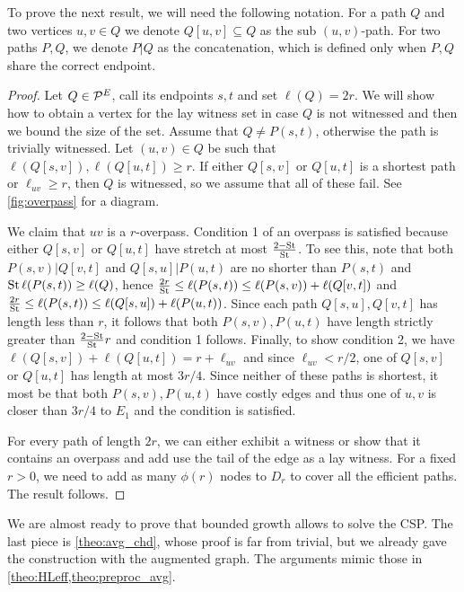 To prove the next result, we will need the following notation.
For a path $Q$ and two vertices $u,v\in Q$ we denote $Q[u,v]\subseteq Q$ as the sub $(u,v)$-path.
For two paths $P,Q$, we denote $P|Q$ as the concatenation, which is defined only when $P,Q$ share the correct endpoint.

\begin{proof}
Let $Q\in\mathcal{P}^E$, call its endpoints $s,t$ and set $\ell(Q)=2r$.
We will show how to obtain a vertex for the lay witness set in case $Q$ is not witnessed and then we bound the size of the set.
Assume that $Q\neq P(s,t)$, otherwise the path is trivially witnessed.
Let $(u,v)\in Q$ be such that $\ell(Q[s,v]),\ell(Q[u,t])\geq r$. 
If either $Q[s,v]$ or $Q[u,t]$ is a shortest path or $\ell_{uv}\geq r$, then $Q$ is witnessed, so we assume that all of these fail.
See \cref{fig:overpass} for a diagram.

We claim that $uv$ is a $r$-overpass.
Condition 1 of an overpass is satisfied because either $Q[s,v]$ or $Q[u,t]$ have stretch at most $\frac{2-\operatorname{St}}{\operatorname{St}}$.
To see this, note that both $P(s,v)|Q[v,t]$ and $Q[s,u]|P(u,t)$ are no shorter than $P(s,t)$ and $\operatorname{St}\ell(P(s,t))\geq \ell(Q)$, hence
$\frac{2r}{\operatorname{St}}\leq \ell(P(s,t)) \leq  \ell(P(s,v)) + \ell(Q[v,t])$ and $\frac{2r}{\operatorname{St}} \leq \ell(P(s,t)) \leq  \ell(Q[s,u]) + \ell(P(u,t))$.
Since each path $Q[s,u],Q[v,t]$ has length less than $r$, it follows that both $P(s,v),P(u,t)$ have length strictly greater than $\frac{2-\operatorname{St}}{\operatorname{St}}r$ and condition 1 follows. 
Finally, to show condition 2, we have $\ell(Q[s,v])+\ell(Q[u,t])=r+\ell_{uv}$ and since $\ell_{uv}<r/2$, one of $Q[s,v]$ or $Q[u,t]$ has length at most $3r/4$.
Since neither of these paths is shortest, it most be that both $P(s,v),P(u,t)$ have costly edges and thus one of $u,v$ is closer than $3r/4$ to $E_1$ and the condition is satisfied.

For every path of length $2r$, we can either exhibit a witness or show that it contains an overpass and add use the tail of the edge as a lay witness.
For a fixed $r>0$, we need to add as many $\phi(r)$ nodes to $D_r$ to cover all the efficient paths. 
The result follows.
\end{proof}

We are almost ready to prove that bounded growth allows to solve the CSP.
The last piece is \cref{theo:avg_chd}, whose proof is far from trivial, but we already gave the construction with the augmented graph.
The arguments mimic those in \cref{theo:HLeff,theo:preproc_avg}.

